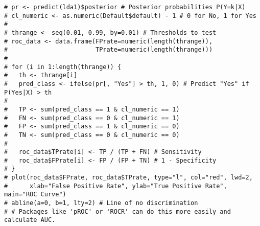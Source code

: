 \documentclass[12pt,a4paper]{article}
\begin{document}
\begin{itemize}
\begin{itemize}
\begin{lstlisting}[caption={Generating ROC Curve Data (Conceptual, Slides L4 p.21)}]
# pr <- predict(lda1)$posterior # Posterior probabilities P(Y=k|X)
# cl_numeric <- as.numeric(Default$default) - 1 # 0 for No, 1 for Yes
# 
# thrange <- seq(0.01, 0.99, by=0.01) # Thresholds to test
# roc_data <- data.frame(FPrate=numeric(length(thrange)), 
#                        TPrate=numeric(length(thrange)))
# 
# for (i in 1:length(thrange)) {
#   th <- thrange[i]
#   pred_class <- ifelse(pr[, "Yes"] > th, 1, 0) # Predict "Yes" if P(Yes|X) > th
#   
#   TP <- sum(pred_class == 1 & cl_numeric == 1)
#   FN <- sum(pred_class == 0 & cl_numeric == 1)
#   FP <- sum(pred_class == 1 & cl_numeric == 0)
#   TN <- sum(pred_class == 0 & cl_numeric == 0)
#   
#   roc_data$TPrate[i] <- TP / (TP + FN) # Sensitivity
#   roc_data$FPrate[i] <- FP / (FP + TN) # 1 - Specificity
# }
# plot(roc_data$FPrate, roc_data$TPrate, type="l", col="red", lwd=2,
#      xlab="False Positive Rate", ylab="True Positive Rate", main="ROC Curve")
# abline(a=0, b=1, lty=2) # Line of no discrimination
# # Packages like 'pROC' or 'ROCR' can do this more easily and calculate AUC.
\end{lstlisting}
        \end{itemize}


\end{itemize}
\end{document}
